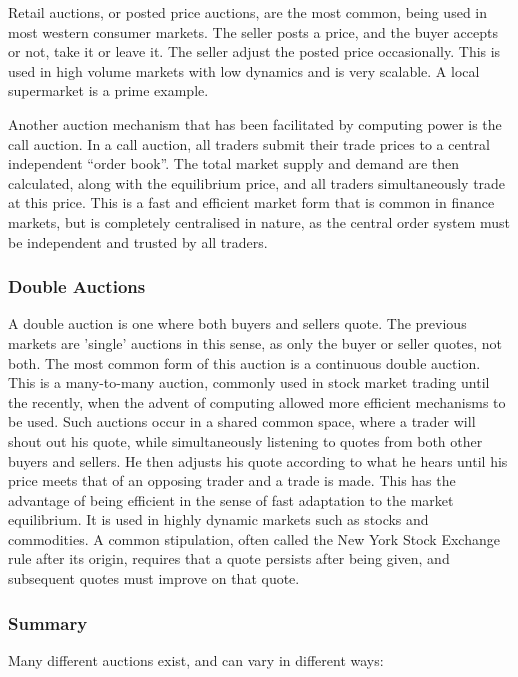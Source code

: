 Retail auctions, or posted price auctions, are the most common, being used in
most western consumer markets. The seller posts a price, and the buyer accepts or
not, take it or leave it.  The seller adjust the posted price occasionally.
This is used in high volume markets with low dynamics and is very scalable.
A local supermarket is a prime example.

Another auction mechanism that has been facilitated by computing power is the
call auction. In a call auction, all traders submit their trade prices to a
central independent ``order book''. The total market supply and demand are then
calculated, along with the equilibrium price, and all traders simultaneously
trade at this price. This is a fast and efficient market form that is common in
finance markets, but is completely centralised in nature, as the central order
system must be independent and trusted by all traders.

\subsubsection{Double Auctions}

A double auction is one where both buyers and sellers quote. The previous
markets are 'single' auctions in this sense, as only the buyer or seller
quotes, not both.  The most common form of this auction is a continuous double
auction. This is a many-to-many auction, commonly used in stock market trading
until the recently, when the advent of computing allowed more efficient
mechanisms to be used. Such auctions occur in a shared common space, where a
trader will shout out his quote, while simultaneously listening to quotes from
both other buyers and sellers. He then adjusts his quote according to what he
hears until his price meets that of an opposing trader and a trade is made.
This has the advantage of being efficient in the sense of fast adaptation to the
market equilibrium. It is used in highly dynamic markets such as stocks and
commodities. A common stipulation, often called the New York Stock Exchange
rule after its origin, requires that a quote persists after being given, and
subsequent quotes must improve on that quote.

\subsubsection{Summary}

Many different auctions exist, and can vary in different ways:

